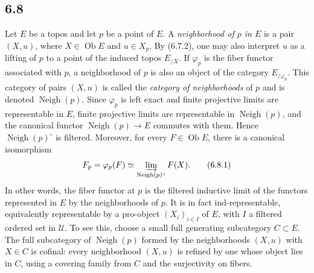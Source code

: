 \documentclass[11pt]{article}
\newcommand{\U}{\mathcal{U}}
\newcommand{\Ob}{\operatorname{Ob}}
\newcommand{\Vvois}{\operatorname{Neigh}}
\begin{document}
\subsection*{6.8}
Let \(E\) be a topos and let \(p\) be a point of \(E\). A \emph{neighborhood of \(p\) in \(E\)} is a pair \((X,u)\), where \(X\in\Ob E\) and \(u\in X_p\). By (6.7.2), one may also interpret \(u\) as a lifting of \(p\) to a point of the induced topos \(E_{/X}\). If \(\varphi_p\) is the fiber functor associated with \(p\), a neighborhood of \(p\) is also an object of the category \(E_{/\varphi_p}\). This category of pairs \((X,u)\) is called the \emph{category of neighborhoods} of \(p\) and is denoted \(\Vvois(p)\). Since \(\varphi_p\) is left exact and finite projective limits are representable in \(E\), finite projective limits are representable in \(\Vvois(p)\), and the canonical functor \(\Vvois(p)\to E\) commutes with them. Hence \(\Vvois(p)^\circ\) is filtered. Moreover, for every \(F\in\Ob E\), there is a canonical isomorphism
\begin{equation*}
F_p=\varphi_p(F)\simeq\varinjlim_{\Vvois(p)^\circ}F(X).\tag{6.8.1}
\end{equation*}
In other words, the fiber functor at \(p\) is the filtered inductive limit of the functors represented in \(E\) by the neighborhoods of \(p\). It is in fact ind-representable, equivalently representable by a pro-object \((X_i)_{i\in I}\) of \(E\), with \(I\) a filtered ordered set in \(\U\). To see this, choose a small full generating subcategory \(C\subset E\). The full subcategory of \(\Vvois(p)\) formed by the neighborhoods \((X,u)\) with \(X\in C\) is cofinal: every neighborhood \((X,u)\) is refined by one whose object lies in \(C\), using a covering family from \(C\) and the surjectivity on fibers.
\end{document}
